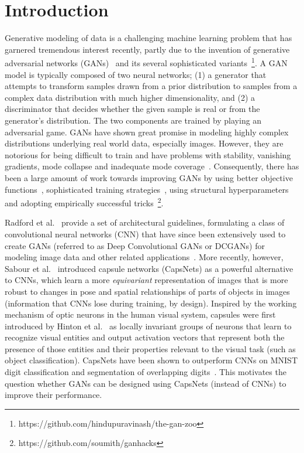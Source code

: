 \section{Introduction}
\label{sec:introduction}
Generative modeling of data is a challenging machine learning problem that has garnered tremendous interest recently, partly due to the invention of generative adversarial networks (GANs)~\cite{bib:gan} and its several sophisticated variants~\footnote{https://github.com/hindupuravinash/the-gan-zoo}. A GAN model is typically composed of two neural networks; (1) a generator that attempts to transform samples drawn from a  prior distribution to samples from a complex data distribution with much higher dimensionality, and (2) a discriminator that decides whether the given sample is real or from the generator's distribution. The two components are trained by playing an adversarial game. GANs have shown great promise in modeling highly complex distributions underlying real world data, especially images. However, they are notorious for being difficult to train and have problems with stability, vanishing gradients, mode collapse and inadequate mode coverage~\cite{bib:dcgan, bib:igan, bib:gman}. Consequently, there has been a large amount of work towards improving GANs by using better objective functions~\cite{bib:wgan, bib:iwgan, bib:began}, sophisticated training strategies~\cite{bib:igan}, using structural hyperparameters~\cite{bib:dcgan, bib:acgan} and adopting empirically successful tricks~\footnote{https://github.com/soumith/ganhacks}.

Radford et al.~\cite{bib:dcgan} provide a set of architectural guidelines, formulating a class of convolutional neural networks (CNN) that have since been extensively used to create GANs (referred to as Deep Convolutional GANs or DCGANs) for modeling image data and other related applications~\cite{bib:im_synth, bib:im2im_tr}. More recently, however, Sabour et al.~\cite{bib:capsnet} introduced capsule networks (CapsNets) as a powerful alternative to CNNs, which learn a more \emph{equivariant} representation of images that is more robust to changes in pose and spatial relationships of parts of objects in images~\cite{bib:transauto} (information that CNNs lose during training, by design). Inspired by the working mechanism of optic neurons in the human visual system, capsules were first introduced by Hinton et al.~\cite{bib:transauto} as locally invariant groups of neurons that learn to recognize visual entities and output activation vectors that represent both the presence of those entities and their properties relevant to the visual task (such as object classification). CapsNets have been shown to outperform CNNs on MNIST digit classification and segmentation of overlapping digits~\cite{bib:capsnet}. This motivates the question whether GANs can be designed using CapsNets (instead of CNNs) to improve their performance.

